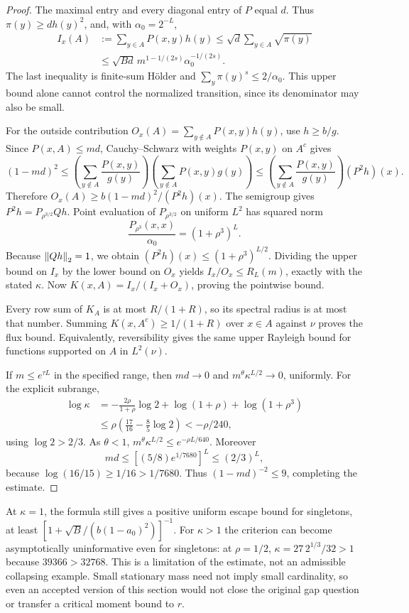 \begin{proof}
The maximal entry and every diagonal entry of $P$ equal $d$. Thus $\pi(y)\geq d h(y)^2$, and, with $\alpha_0=2^{-L}$,
\begin{align*}
 I_x(A)&:=\sum_{y\in A}P(x,y)h(y)
 \leq\sqrt d\sum_{y\in A}\sqrt{\pi(y)}\\
 &\leq\sqrt{Bd}\,m^{1-1/(2s)}\alpha_0^{-1/(2s)}.
\end{align*}
The last inequality is finite-sum H\"older and $\sum_y\pi(y)^s\leq2/\alpha_0$. This upper bound alone cannot control the normalized transition, since its denominator may also be small.

For the outside contribution $O_x(A)=\sum_{y\notin A}P(x,y)h(y)$, use $h\geq b/g$. Since $P(x,A)\leq md$, Cauchy--Schwarz with weights $P(x,y)$ on $A^c$ gives
\[
 (1-md)^2\leq
 \left(\sum_{y\notin A}\frac{P(x,y)}{g(y)}\right)
 \left(\sum_{y\notin A}P(x,y)g(y)\right)
 \leq\left(\sum_{y\notin A}\frac{P(x,y)}{g(y)}\right)(P^2h)(x).
\]
Therefore $O_x(A)\geq b(1-md)^2/(P^2h)(x)$. The semigroup gives $P^2h=P_{\rho^{3/2}}Qh$. Point evaluation of $P_{\rho^{3/2}}$ on uniform $L^2$ has squared norm
\[
 \frac{P_{\rho^3}(x,x)}{\alpha_0}=(1+\rho^3)^L.
\]
Because $\left\|Qh\right\|_2=1$, we obtain $(P^2h)(x)\leq(1+\rho^3)^{L/2}$. Dividing the upper bound on $I_x$ by the lower bound on $O_x$ yields $I_x/O_x\leq R_L(m)$, exactly with the stated $\kappa$. Now $K(x,A)=I_x/(I_x+O_x)$, proving the pointwise bound.

Every row sum of $K_A$ is at most $R/(1+R)$, so its spectral radius is at most that number. Summing $K(x,A^c)\geq1/(1+R)$ over $x\in A$ against $\nu$ proves the flux bound. Equivalently, reversibility gives the same upper Rayleigh bound for functions supported on $A$ in $L^2(\nu)$.

If $m\leq e^{\tau L}$ in the specified range, then $md\to0$ and $m^\theta\kappa^{L/2}\to0$, uniformly. For the explicit subrange,
\begin{align*}
 \log\kappa
 &=-\frac{2\rho}{1+\rho}\log2+\log(1+\rho)+\log(1+\rho^3)\\
 &\leq\rho\left(\frac{17}{16}-\frac85\log2\right)
 <-\rho/240,
\end{align*}
using $\log2>2/3$. As $\theta<1$, $m^\theta\kappa^{L/2}\leq e^{-\rho L/640}$. Moreover
\[
 md\leq[(5/8)e^{1/7680}]^L\leq(2/3)^L,
\]
because $\log(16/15)\geq1/16>1/7680$. Thus $(1-md)^{-2}\leq9$, completing the estimate.
\end{proof}

At $\kappa=1$, the formula still gives a positive uniform escape bound for singletons, at least $[1+\sqrt B/(b(1-a_0)^2)]^{-1}$. For $\kappa>1$ the criterion can become asymptotically uninformative even for singletons: at $\rho=1/2$, $\kappa=27\,2^{1/3}/32>1$ because $39366>32768$. This is a limitation of the estimate, not an admissible collapsing example. Small stationary mass need not imply small cardinality, so even an accepted version of this section would not close the original gap question or transfer a critical moment bound to $r$.
